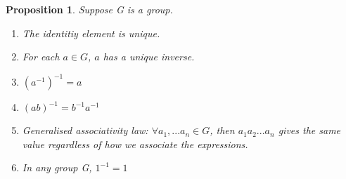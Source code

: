 \documentclass[11pt, oneside]{book}
\theoremstyle{break}
\newtheorem{propo}{Proposition}[section]
\begin{document}
\begin{propo}
    Suppose G is a group.
    \begin{enumerate}
        \item The identitiy element is unique.
        \item For each $a \in G$, $a$ has a unique inverse.
        \item $(a^{-1})^{-1} = a$
        \item $(ab)^{-1} = b^{-1} a^{-1}$
        \item Generalised associativity law: $\forall a_1, ... a_n \in G$, then $a_1 a_2 ... a_n$ gives the same value regardless of how we associate the expressions.
        \item In any group G, $1^{-1} = 1$
    \end{enumerate}
\end{propo}
\end{document}
